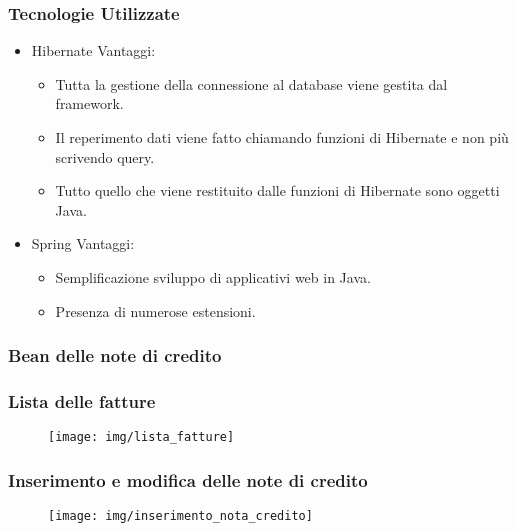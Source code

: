 \documentclass[]{beamer}
\begin{document}
    \begin{frame}
            \frametitle{Tecnologie Utilizzate}
            \begin{itemize}
                \item Hibernate
                    \newline
                    Vantaggi:
                    \begin{itemize}
                        \item Tutta la gestione della connessione al database viene 
                            gestita dal framework.
                        \item Il reperimento dati viene fatto chiamando funzioni di 
                            Hibernate e non più scrivendo query. 
                        \item Tutto quello che viene restituito dalle funzioni di 
                            Hibernate sono oggetti Java.
                    \end{itemize}
                \item Spring
                    \newline
                    Vantaggi:
                    \begin{itemize}
                        \item Semplificazione sviluppo di applicativi web in Java.
                        \item Presenza di numerose estensioni.
                    \end{itemize}
            \end{itemize}
    \end{frame}

    \begin{frame}
        \frametitle{Bean delle note di credito}
        
    \end{frame}

    \begin{frame}
        \frametitle{Lista delle fatture}
        \begin{figure}[H]
            \centering
            \texttt{[image: img/lista\_fatture]}\label{img:lista_fatture}
        \end{figure}
    \end{frame}

    \begin{frame}
        \frametitle{Inserimento e modifica delle note di credito}
        \begin{figure}[H]
            \centering
            \texttt{[image: img/inserimento\_nota\_credito]}\label{fig:insert}
        \end{figure}
    \end{frame}
\end{document}
